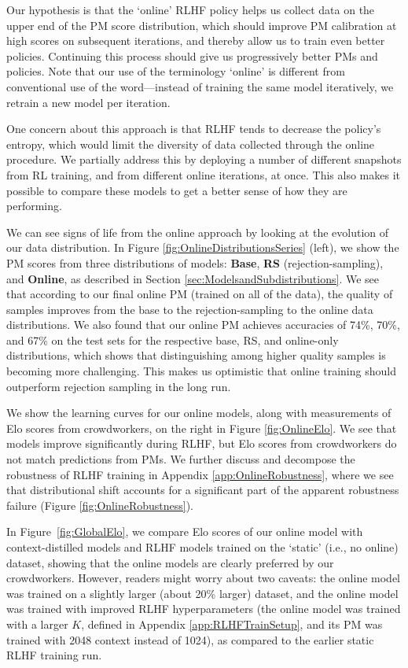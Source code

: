Our hypothesis is that the `online' RLHF policy helps us collect data on the upper end of the PM score distribution, which should improve PM calibration at high scores on subsequent iterations, and thereby allow us to train even better policies. Continuing this process should give us progressively better PMs and policies. Note that our use of the terminology `online' is different from conventional use of the word---instead of training the same model iteratively, we retrain a new model per iteration.

One concern about this approach is that RLHF tends to decrease the policy's entropy, which would limit the diversity of data collected through the online procedure. We partially address this by deploying a number of different snapshots from RL training, and from different online iterations, at once.  This also makes it possible to compare these models to get a better sense of how they are performing.

We can see signs of life from the online approach by looking at the evolution of our data distribution. In Figure \ref{fig:OnlineDistributionsSeries} (left), we show the PM scores from three distributions of models:  {\bf Base}, {\bf RS} (rejection-sampling), and {\bf Online}, as described in Section \ref{sec:ModelsandSubdistributions}. We see that according to our final online PM (trained on all of the data), the quality of samples improves from the base to the rejection-sampling to the online data distributions. We also found that our online PM achieves accuracies of 74\%, 70\%, and 67\% on the test sets for the respective base, RS, and online-only distributions, which shows that distinguishing among higher quality samples is becoming more challenging. This makes us optimistic that online training should outperform rejection sampling in the long run.  

We show the learning curves for our online models, along with measurements of Elo scores from crowdworkers, on the right in Figure \ref{fig:OnlineElo}.  We see that models improve significantly during RLHF, but Elo scores from crowdworkers do not match predictions from PMs.   We further discuss and decompose the robustness of RLHF training in Appendix \ref{app:OnlineRobustness}, where we see that distributional shift accounts for a significant part of the apparent robustness failure (Figure \ref{fig:OnlineRobustness}).

In Figure~\ref{fig:GlobalElo}, we compare Elo scores of our online model with context-distilled models and RLHF models trained on the `static' (i.e., no online) dataset, showing that the online models are clearly preferred by our crowdworkers.  However, readers might worry about two caveats: the online model was trained on a slightly larger (about 20\% larger) dataset, and the online model was trained with improved RLHF hyperparameters (the online model was trained with a larger $K$, defined in Appendix \ref{app:RLHFTrainSetup}, and its PM was trained with 2048 context instead of 1024), as compared to the earlier static RLHF training run.

